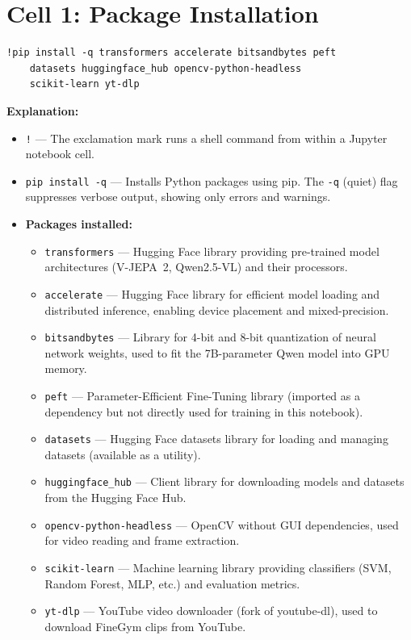 \documentclass[a4paper, 12pt]{article}
\newenvironment{explanation}{%
  \par\smallskip
  \noindent\textcolor{blue!70!black}{\textbf{Explanation:}}\\
  \noindent
}{\par\medskip}
\begin{document}
\newpage
\section{Cell 1: Package Installation}

\begin{lstlisting}
!pip install -q transformers accelerate bitsandbytes peft
    datasets huggingface_hub opencv-python-headless
    scikit-learn yt-dlp
\end{lstlisting}

\begin{explanation}
\begin{itemize}[nosep]
  \item \texttt{!} --- The exclamation mark runs a shell command from within a Jupyter notebook cell.
  \item \texttt{pip install -q} --- Installs Python packages using pip. The \texttt{-q} (quiet) flag suppresses verbose output, showing only errors and warnings.
  \item \textbf{Packages installed:}
  \begin{itemize}[nosep]
    \item \texttt{transformers} --- Hugging Face library providing pre-trained model architectures (V-JEPA~2, Qwen2.5-VL) and their processors.
    \item \texttt{accelerate} --- Hugging Face library for efficient model loading and distributed inference, enabling device placement and mixed-precision.
    \item \texttt{bitsandbytes} --- Library for 4-bit and 8-bit quantization of neural network weights, used to fit the 7B-parameter Qwen model into GPU memory.
    \item \texttt{peft} --- Parameter-Efficient Fine-Tuning library (imported as a dependency but not directly used for training in this notebook).
    \item \texttt{datasets} --- Hugging Face datasets library for loading and managing datasets (available as a utility).
    \item \texttt{huggingface\_hub} --- Client library for downloading models and datasets from the Hugging Face Hub.
    \item \texttt{opencv-python-headless} --- OpenCV without GUI dependencies, used for video reading and frame extraction.
    \item \texttt{scikit-learn} --- Machine learning library providing classifiers (SVM, Random Forest, MLP, etc.) and evaluation metrics.
    \item \texttt{yt-dlp} --- YouTube video downloader (fork of youtube-dl), used to download FineGym clips from YouTube.
  \end{itemize}
\end{itemize}
\end{explanation}
\end{document}
